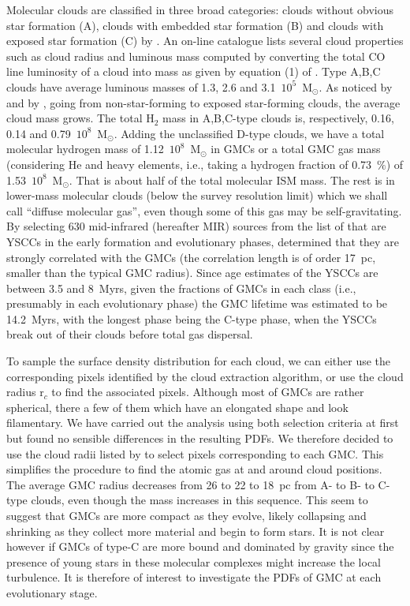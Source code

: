 \documentclass{aa}
\begin{document}
Molecular clouds are classified in three broad categories: clouds without obvious
star formation (A), clouds with embedded star formation (B) and clouds with
exposed star formation (C) by  \citet{2017A&A...601A.146C}.  An on-line catalogue lists
several cloud properties such as cloud radius and luminous mass computed by
converting the total CO  line luminosity of a cloud into mass  as given by
equation (1) of \citet{2017A&A...601A.146C}. Type A,B,C clouds
have average luminous masses of 1.3, 2.6 and 3.1~$10^5$~M$_\odot$. As noticed
by \citet{2017A&A...601A.146C} and by \citet{2018A&A...612A..51B},  going from non-star-forming to
exposed star-forming clouds, the average cloud mass grows.  The total H$_2$ mass in
A,B,C-type clouds is, respectively, 0.16, 0.14 and 0.79~$10^8$~M$_\odot$.  Adding
the unclassified D-type clouds, we have a total molecular hydrogen mass  of
1.12~$10^8$~M$_\odot$ in GMCs or a total GMC gas mass (considering He and heavy
elements, i.e., taking a hydrogen fraction of 0.73~$\%$) of 1.53~$10^8$~M$_\odot$.
That is about half of the total molecular ISM mass. The rest is in lower-mass
molecular clouds (below the survey resolution limit) which we shall call ``diffuse
molecular gas'', even though some of this gas may be self-gravitating.
By selecting 630  mid-infrared (hereafter MIR) sources from the list of \citet{2011A&A...534A..96S} that
are YSCCs in the early
formation and evolutionary phases, \citet{2017A&A...601A.146C} determined that they are
strongly correlated with the GMCs (the correlation length is of order 17~pc, smaller than 
the typical GMC radius). Since age
estimates of  the YSCCs are between 3.5 and 8~Myrs, given the fractions of GMCs in each
class (i.e., presumably in each evolutionary phase)  the GMC lifetime  was
estimated to be 14.2~Myrs, with the longest phase being the C-type phase, when the
YSCCs break out of their clouds before total gas dispersal.

To sample the surface density distribution for each cloud, we can either use the
corresponding pixels identified by the cloud extraction algorithm, or use the
cloud radius r$_c$ to find the associated pixels. Although most of GMCs are rather
spherical, there a few of them which have an elongated shape and look filamentary.
We have  carried out the analysis using both selection criteria at first but found
no sensible differences in the resulting PDFs. We therefore decided to use the cloud radii
listed by \citet{2017A&A...601A.146C}  to select  pixels corresponding to each GMC. This
simplifies the procedure to find the atomic gas at and around cloud positions. The average GMC 
radius decreases from 26 to 22 to 18~pc from A- to B- to C-type clouds, even though the mass 
increases in this sequence.
 This seem to suggest that GMCs are more compact as they evolve, likely collapsing and shrinking 
 as they collect more material and begin to form stars. It is not clear however if GMCs of
type-C are more bound and dominated by gravity since the presence of young stars in these molecular
complexes  might increase the local turbulence.  It is therefore of
interest to investigate the PDFs of GMC at each evolutionary stage.
\end{document}
